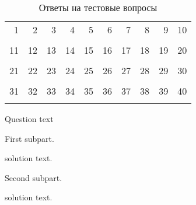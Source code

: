 \documentclass[12pt, table]{exam}
\begin{document}
\begin{questions}
{{\begin{table}[htbp]
			\label{tab:addlabel}%
		\end{table}%
	}
}
{
	{
		\begin{table}[htbp]
			\centering
			\Large
			\caption{Ответы на тестовые вопросы}
			\begin{tabular}{|r|r|r|r|r|r|r|r|r|r|}
				\hline
				1     & 2     & 3     & 4     & 5     & 6     & 7     & 8     & 9     & 10 \\
				&      &       &       &       &       &       &       &       &  \\
				11    & 12    & 13    & 14    & 15    & 16    & 17    & 18    & 19    & 20 \\
				&       &       &       &       &       &       &       &       &  \\
				21    & 22    & 23    & 24    & 25    & 26    & 27    & 28    & 29    & 30 \\
				&       &       &       &       &       &       &       &       &  \\
				31    & 32    & 33    & 34    & 35    & 36    & 37    & 38    & 39    & 40 \\
				&       &       &       &       &       &       &       &       &  \\\hline
			\end{tabular}%
			\label{tab:addlabel}%
		\end{table}%
	}
}

	
\question[20]
Question text
\noaddpoints
\begin{subparts}
\subpart[10] First subpart.

\begin{solution}[18em]
	solution text.
\end{solution}

\subpart[5] Second subpart.

\begin{solution}[9em]
	solution text.
\end{solution}

\subpart[5] 

\begin{solution}[12em]
\end{solution}

\end{subparts}
\addpoints

\question[20]

\noaddpoints
\begin{subparts}
\subpart[10] 
\subpart[10] 

\begin{solution}[43em]
\end{solution}

\end{subparts}
\addpoints

\end{questions}
\end{document}
